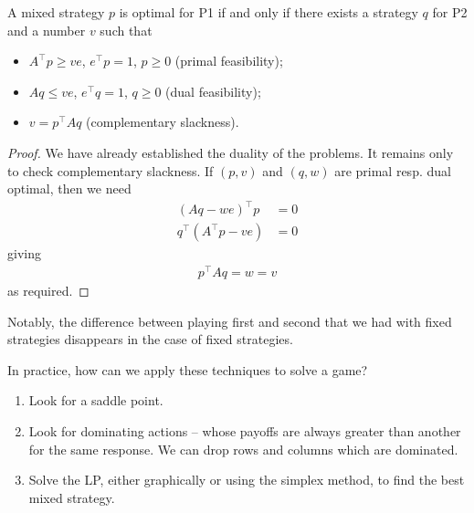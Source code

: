 \documentclass{../template/note}
\begin{document}
    \begin{theorem}
        A mixed strategy $p$ is optimal for P1 if and only if there exists a strategy $q$ for P2 and a number $v$ such that
        \begin{itemize}
            \item $A^\intercal p \geq ve$, $e^\intercal p = 1$, $p \geq 0$ (primal feasibility);
            \item $Aq \leq ve$, $e^\intercal q = 1$, $q \geq 0$ (dual feasibility);
            \item $v = p^\intercal Aq$ (complementary slackness).
        \end{itemize}
    \end{theorem}
    
    \begin{proof}
        We have already established the duality of the problems. It remains only to check complementary slackness. If $(p, v)$ and $(q, w)$ are primal resp. dual optimal, then we need
        \begin{align*}
            (Aq-we)^\intercal p &= 0 \\
            q^\intercal (A^\intercal p - ve) &= 0
        \end{align*}
        giving
        \begin{align*}
            p^\intercal Aq = w = v
        \end{align*}
        as required.       
    \end{proof}
    
    Notably, the difference between playing first and second that we had with fixed strategies disappears in the case of fixed strategies.

    In practice, how can we apply these techniques to solve a game?
    \begin{enumerate}[label=\protect\circled{\arabic*}]
        \item Look for a saddle point.
        \item Look for dominating actions -- whose payoffs are always greater than another for the same response. We can drop rows and columns which are dominated.
        \item Solve the LP, either graphically or using the simplex method, to find the best mixed strategy.
    \end{enumerate}
    
\end{document}
